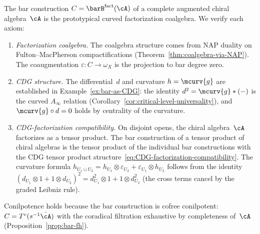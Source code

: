 \begin{example}
\label{ex:bar-fact-CDG}
The bar construction
$C = \barB^{\mathrm{fact}}(\cA)$ of a complete augmented chiral
algebra~$\cA$ is the prototypical curved factorization coalgebra.
We verify each axiom:
\begin{enumerate}[label=\textup{(\roman*)}]
\item \emph{Factorization coalgebra.}
 The coalgebra structure comes from NAP duality on
 Fulton--MacPherson compactifications
 (Theorem~\ref{thm:coalgebra-via-NAP}). The coaugmentation
 $\varepsilon \colon C \to \omega_X$ is the projection to bar
 degree zero.
\item \emph{CDG structure.}
 The differential~$d$ and curvature
 $h = \mcurv{g}$ are established in
 Example~\ref{ex:bar-as-CDG}: the identity
 $d^2 = \mcurv{g} \ast (-)$ is the curved $A_\infty$ relation
 (Corollary~\ref{cor:critical-level-universality}), and
 $\mcurv{g} \circ d = 0$ holds by centrality of the curvature.
\item \emph{CDG-factorization compatibility.}
 On disjoint opens, the chiral algebra~$\cA$ factorizes as a
 tensor product. The bar construction of a tensor product of
 chiral algebras is the tensor product of the individual bar
 constructions with the CDG tensor product
 structure~\eqref{eq:CDG-factorization-compatibility}. The
 curvature formula
 $h_{U_1 \sqcup U_2} = h_{U_1} \otimes \varepsilon_{U_2}
 + \varepsilon_{U_1} \otimes h_{U_2}$
 follows from the identity
 $(d_{U_1} \otimes 1 + 1 \otimes d_{U_2})^2
 = d_{U_1}^2 \otimes 1 + 1 \otimes d_{U_2}^2$
 (the cross terms cancel by the graded Leibniz rule).
\end{enumerate}
Conilpotence holds because the bar construction is cofree
conilpotent: $C = T^c(s^{-1}\bar{\cA})$ with the coradical
filtration exhaustive by completeness of~$\cA$
(Proposition~\ref{prop:bar-fh}).
\end{example}

